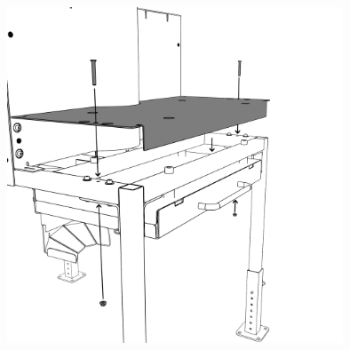 \vspace{1em}

\begin{center}
    \includegraphics[height=10cm]{../images/_402_.png}
\end{center}

\vspace{0.7em}



